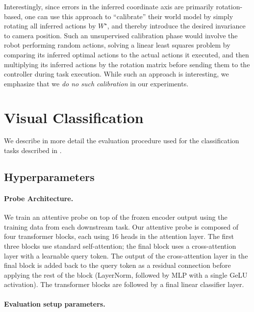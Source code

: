 \documentclass[]{fairmeta}
\begin{document}
Interestingly, since errors in the inferred coordinate axis are primarily rotation-based, one can use this approach to ``calibrate'' their world model by simply rotating all inferred actions by $W^\star$, and thereby introduce the desired invariance to camera position.
Such an unsupervised calibration phase would involve the robot performing random actions, solving a linear least squares problem by comparing its inferred optimal actions to the actual actions it executed, and then multiplying its inferred actions by the rotation matrix before sending them to the controller during task execution.
While such an approach is interesting, we emphasize that we \emph{do no such calibration} in our experiments.



\section{Visual Classification} \label{app:probe_understanding}

We describe in more detail the evaluation procedure used for the classification tasks described in .

\subsection{Hyperparameters} \label{app:probe_understanding_hp}

\paragraph{\bf Probe Architecture.}
We train an attentive probe on top of the frozen encoder output using the training data from each downstream task. Our attentive probe is composed of four transformer blocks, each using 16 heads in the attention layer. The first three blocks use standard self-attention; the final block uses a cross-attention layer with a learnable query token. The output of the cross-attention layer in the final block is added back to the query token as a residual connection before applying the rest of the block (LayerNorm, followed by MLP with a single GeLU activation). The transformer blocks are followed by a final linear classifier layer.

\paragraph{\bf Evaluation setup parameters.}
\end{document}
